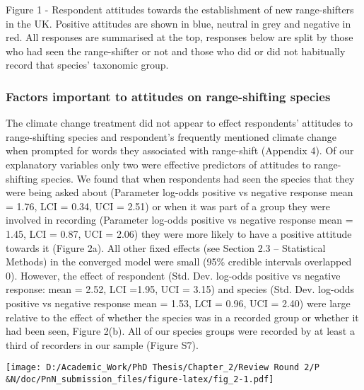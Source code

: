\documentclass[
]{article}
\begin{document}
Figure 1 - Respondent attitudes towards the establishment of new
range-shifters in the UK. Positive attitudes are shown in blue, neutral
in grey and negative in red. All responses are summarised at the top,
responses below are split by those who had seen the range-shifter or not
and those who did or did not habitually record that species' taxonomic
group.

\hypertarget{factors-important-to-attitudes-on-range-shifting-species}{%
\subsubsection{Factors important to attitudes on range-shifting
species}\label{factors-important-to-attitudes-on-range-shifting-species}}

The climate change treatment did not appear to effect respondents'
attitudes to range-shifting species and respondent's frequently
mentioned climate change when prompted for words they associated with
range-shift (Appendix 4). Of our explanatory variables only two were
effective predictors of attitudes to range-shifting species. We found
that when respondents had seen the species that they were being asked
about (Parameter log-odds positive vs negative response mean = 1.76, LCI
= 0.34, UCI = 2.51) or when it was part of a group they were involved in
recording (Parameter log-odds positive vs negative response mean = 1.45,
LCI = 0.87, UCI = 2.06) they were more likely to have a positive
attitude towards it (Figure 2a). All other fixed effects (see Section
2.3 -- Statistical Methods) in the converged model were small (95\%
credible intervals overlapped 0). However, the effect of respondent
(Std. Dev. log-odds positive vs negative response: mean = 2.52, LCI
=1.95, UCI = 3.15) and species (Std. Dev. log-odds positive vs negative
response mean = 1.53, LCI = 0.96, UCI = 2.40) were large relative to the
effect of whether the species was in a recorded group or whether it had
been seen, Figure 2(b). All of our species groups were recorded by at
least a third of recorders in our sample (Figure S7).

\texttt{[image: D:/Academic\_Work/PhD Thesis/Chapter\_2/Review Round 2/P\\\&N/doc/PnN\_submission\_files/figure-latex/fig\_2-1.pdf]}
\end{document}
